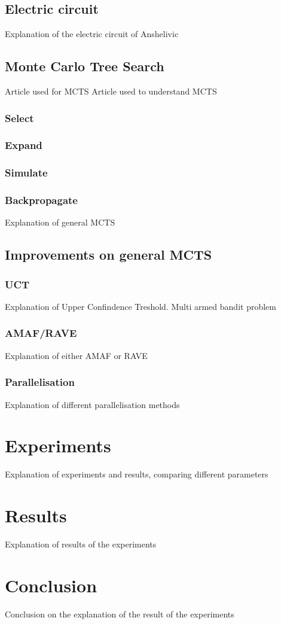 \documentclass{ba-kecs}
\begin{document}
\subsection{Electric circuit}
Explanation of the electric circuit of Anshelivic
\subsection{Monte Carlo Tree Search}
Article used for MCTS \cite{arneson2010monte}
Article used to understand MCTS \cite{browne2012survey}
\subsubsection{Select}
\subsubsection{Expand}
\subsubsection{Simulate}
\subsubsection{Backpropagate}
Explanation of general MCTS
\subsection{Improvements on general MCTS}
\subsubsection{UCT}
Explanation of Upper Confindence Treshold. Multi armed bandit problem
\subsubsection{AMAF/RAVE}

Explanation of either AMAF or RAVE \cite{gelly2011monte}
\subsubsection{Parallelisation}
Explanation of different parallelisation methods

\section{Experiments}
Explanation of experiments and results, comparing different parameters
\section{Results}
Explanation of results of the experiments
\section{Conclusion}
Conclusion on the explanation of the result of the experiments

\end{document}
